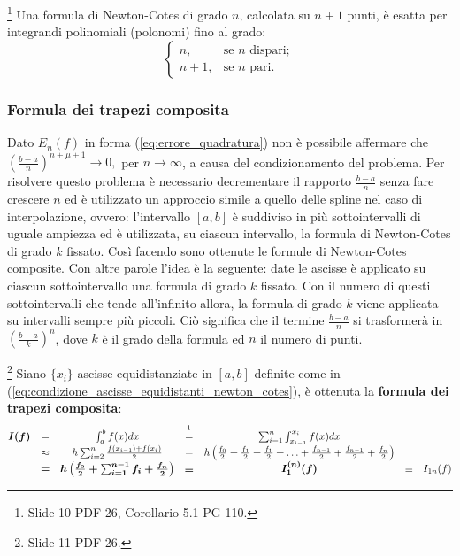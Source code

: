 \begin{remark}
    \footnote{Slide 10 PDF 26, Corollario 5.1 PG 110.} Una formula di Newton-Cotes di grado $n$, calcolata su $n+1$ punti, è esatta per integrandi polinomiali (polonomi) fino al grado:
    \begin{equation*}
        \begin{cases}
            n, &\text{se $n$ dispari};\\
            n+1, &\text{se $n$ pari}.
        \end{cases}
    \end{equation*}
\end{remark}

\subsubsection{Formula dei trapezi composita}
Dato $E_n(f)$ in forma (\ref{eq:errore_quadratura}) non è possibile affermare che $\left(\frac{b-a}{n}\right)^{n+\mu +1}\rightarrow 0,$ per $ n\rightarrow\infty$, a causa del condizionamento del problema. Per risolvere questo problema è necessario decrementare il rapporto $\frac{b-a}{n}$ senza fare crescere $n$ ed è utilizzato un approccio simile a quello delle spline nel caso di interpolazione, ovvero: l'intervallo $[a,b]$ è suddiviso in più sottointervalli di uguale ampiezza ed è utilizzata, su ciascun intervallo, la formula di Newton-Cotes di grado $k$ fissato. Così facendo sono ottenute le formule di Newton-Cotes composite.
Con altre parole l'idea è la seguente: date le ascisse è applicato su ciascun sottointervallo una formula di grado $k$ fissato. Con il numero di questi sottointervalli che tende all'infinito allora, la formula di grado $k$ viene applicata su intervalli sempre più piccoli. Ciò significa che il termine $\frac{b-a}{n}$ si trasformerà in $\left(\frac{b-a}{k}\right)^n$, dove $k$ è il grado della formula ed $n$ il numero di punti.
\begin{definition}\footnote{Slide 11 PDF 26.}
    Siano $\{x_i\}$ ascisse equidistanziate in $[a,b]$ definite come in (\ref{eq:condizione_ascisse_equidistanti_newton_cotes}), è ottenuta la \textbf{formula dei trapezi composita}:
    \begin{equation}\label{eq:formTrapComp}
        \begin{matrix}
            \boldsymbol{I(f)}&=&\int_a^b f(x) dx &\overset{\footnotemark}{=}&\sum_{i=1}^n\int_{x_{i-1}}^{x_i} f(x)dx\\
            &\approx& h\sum_{i=2}^n\frac{f(x_{i-1})+f(x_i)}{2} &=& h\left(\frac{f_0}{2}+\frac{f_1}{2}+\frac{f_1}{2}+\hdots +\frac{f_{n-1}}{2}+\frac{f_{n-1}}{2}+\frac{f_n}{2}\right)\\
            &\boldsymbol =&\boldsymbol{h\left(\frac{f_0}{2}+\sum_{i=1}^{n-1}f_i+\frac{f_n}{2}\right)} &\boldsymbol\equiv& \boldsymbol{I_1^{(n)}(f)} &\equiv& I_{1n}(f)
        \end{matrix}
    \end{equation}
\end{definition}


